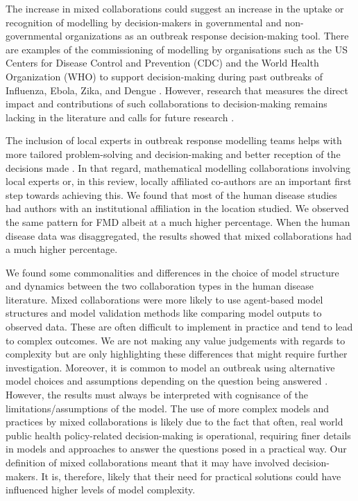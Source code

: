 \documentclass[10pt,letterpaper]{article}
\begin{document}
The increase in mixed collaborations could suggest an increase in the uptake or recognition of modelling by decision-makers in governmental and non-governmental organizations as an outbreak response decision-making tool. There are examples of the commissioning of modelling by organisations such as the US Centers for Disease Control and Prevention (CDC) and the World Health Organization (WHO) to support decision-making during past outbreaks of Influenza, Ebola, Zika, and Dengue \cite{Muscatello2017}. However, research that measures the direct impact and contributions of such collaborations to decision-making remains lacking in the literature and calls for future research \cite{Muscatello2017}. 

The inclusion of local experts in outbreak response modelling teams helps with more tailored problem-solving and decision-making and better reception of the decisions made \cite{Abramowitz2015}. In that regard, mathematical modelling collaborations involving local experts or, in this review, locally affiliated co-authors are an important first step towards achieving this. We found that most of the human disease studies had authors with an institutional affiliation in the location studied. We observed the same pattern for FMD albeit at a much higher percentage. When the human disease data was disaggregated, the results showed that mixed collaborations had a much higher percentage. 

We found some commonalities and differences in the choice of model structure and dynamics between the two collaboration types in the human disease literature. Mixed collaborations were more likely to use agent-based model structures and model validation methods like comparing model outputs to observed data. These are often difficult to implement in practice and tend to lead to complex outcomes. We are not making any value judgements with regards to complexity but are only highlighting these differences that might require further investigation. Moreover, it is common to model an outbreak using alternative model choices and assumptions depending on the question being answered \cite{Basu2013}. However, the results must always be interpreted with cognisance of the limitations/assumptions of the model.  The use of more complex models and practices by mixed collaborations is likely due to the fact that often, real world public health policy-related decision-making is operational, requiring finer details in models and approaches to answer the questions posed in a practical way. Our definition of mixed collaborations meant that it may have involved decision-makers. It is, therefore, likely that their need for practical solutions could have influenced higher levels of model complexity. 
\end{document}
